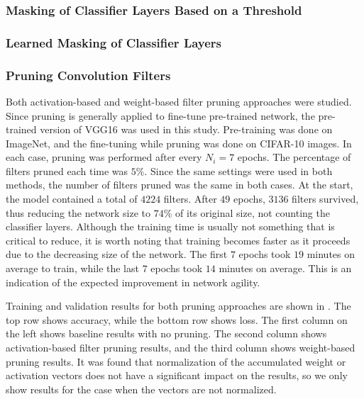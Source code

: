 \documentclass{article}
\begin{document}
\subsubsection{Masking of Classifier Layers Based on a Threshold}

\subsubsection{Learned Masking of Classifier Layers}

\subsubsection{Pruning Convolution Filters} \label{PruneFilterRes}

Both activation-based and weight-based filter pruning approaches were studied. Since pruning is generally applied to fine-tune pre-trained network, the pre-trained version of VGG16 was used in this study. Pre-training was done on ImageNet, and the fine-tuning while pruning was done on CIFAR-10 images. In each case, pruning was performed after every $N_i = 7$ epochs. The percentage of filters pruned each time was $5$\%. Since the same settings were used in both methods, the number of filters pruned was the same in both cases. At the start, the model contained a total of $4224$ filters. After $49$ epochs, $3136$ filters survived, thus reducing the network size to $74$\% of its original size, not counting the classifier layers. Although the training time is usually not something that is critical to reduce, it is worth noting that training becomes faster as it proceeds due to the decreasing size of the network. The first $7$ epochs took $19$ minutes on average to train, while the last $7$ epochs took $14$ minutes on average. This is an indication of the expected improvement in network agility.

Training and validation results for both pruning approaches are shown in . The top row shows accuracy, while the bottom row shows loss. The first column on the left shows baseline results with no pruning. The second column shows activation-based filter pruning results, and the third column shows weight-based pruning results. It was found that normalization of the accumulated weight or activation vectors does not have a significant impact on the results, so we only show results for the case when the vectors are not normalized.
\end{document}

